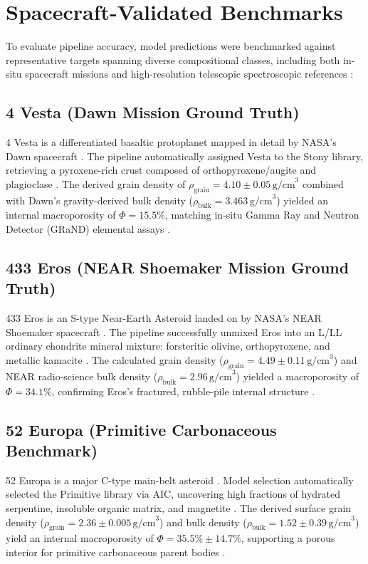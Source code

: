 \documentclass[11pt,a4paper]{article}
\begin{document}
\section{Spacecraft-Validated Benchmarks}
\label{sec:benchmarks}

To evaluate pipeline accuracy, model predictions were benchmarked against representative targets spanning diverse compositional classes, including both in-situ spacecraft missions and high-resolution telescopic spectroscopic references \cite{Russell2012, Veverka2001, Campins2010, Fornasier2013}:

\subsection{4 Vesta (Dawn Mission Ground Truth)}
4 Vesta is a differentiated basaltic protoplanet mapped in detail by NASA's Dawn spacecraft \cite{Russell2012}. The pipeline automatically assigned Vesta to the Stony library, retrieving a pyroxene-rich crust composed of orthopyroxene/augite and plagioclase \cite{Russell2012}. The derived grain density of $\rho_{\text{grain}} = 4.10 \pm 0.05\,\text{g/cm}^3$ combined with Dawn's gravity-derived bulk density ($\rho_{\text{bulk}} = 3.463\,\text{g/cm}^3$) yielded an internal macroporosity of $\Phi = 15.5\%$, matching in-situ Gamma Ray and Neutron Detector (GRaND) elemental assays \cite{Russell2012, Prettyman2012}.

\subsection{433 Eros (NEAR Shoemaker Mission Ground Truth)}
433 Eros is an S-type Near-Earth Asteroid landed on by NASA's NEAR Shoemaker spacecraft \cite{Veverka2001}. The pipeline successfully unmixed Eros into an L/LL ordinary chondrite mineral mixture: forsteritic olivine, orthopyroxene, and metallic kamacite \cite{Veverka2001, Britt2003}. The calculated grain density ($\rho_{\text{grain}} = 4.49 \pm 0.11\,\text{g/cm}^3$) and NEAR radio-science bulk density ($\rho_{\text{bulk}} = 2.96\,\text{g/cm}^3$) yielded a macroporosity of $\Phi = 34.1\%$, confirming Eros's fractured, rubble-pile internal structure \cite{Veverka2001, Britt2002, Yeomans2000}.

\subsection{52 Europa (Primitive Carbonaceous Benchmark)}
52 Europa is a major C-type main-belt asteroid \cite{Fornasier2013}. Model selection automatically selected the Primitive library via AIC, uncovering high fractions of hydrated serpentine, insoluble organic matrix, and magnetite \cite{Akaike1974, Macke2011}. The derived surface grain density ($\rho_{\text{grain}} = 2.36 \pm 0.005\,\text{g/cm}^3$) and bulk density ($\rho_{\text{bulk}} = 1.52 \pm 0.39\,\text{g/cm}^3$) yield an internal macroporosity of $\Phi = 35.5\% \pm 14.7\%$, supporting a porous interior for primitive carbonaceous parent bodies \cite{Macke2011, Fornasier2013}.
\end{document}

